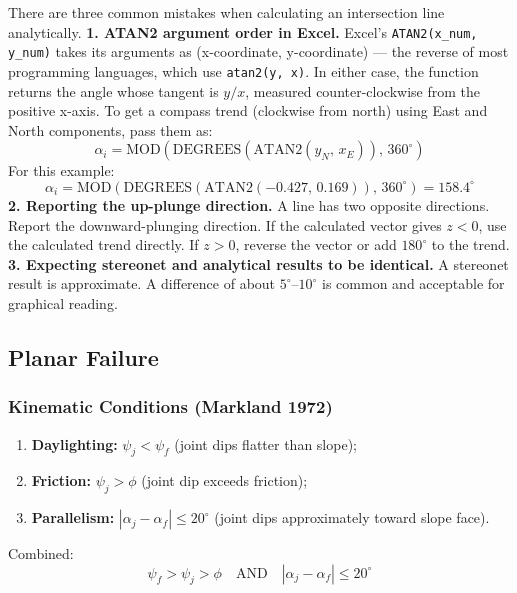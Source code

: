 \documentclass[a4paper,12pt]{article}
\begin{document}
\begin{warnbox}
There are three common mistakes when calculating an intersection line analytically.
\vspace{1.0 em}
\textbf{1. ATAN2 argument order in Excel.}
Excel's \texttt{ATAN2(x\_num, y\_num)} takes its arguments as
(x-coordinate, y-coordinate) --- the reverse of most programming languages,
which use \texttt{atan2(y, x)}. In either case, the function returns the angle
whose tangent is $y/x$, measured counter-clockwise from the positive x-axis.
To get a compass trend (clockwise from north) using East and North components,
pass them as:
\[
\alpha_i =
\mathrm{MOD}\!\left(\mathrm{DEGREES}(\mathrm{ATAN2}(y_N,\, x_E)),\, 360^\circ\right)
\]
For this example:
\[
\alpha_i =
\mathrm{MOD}\!\left(\mathrm{DEGREES}(\mathrm{ATAN2}(-0.427,\, 0.169)),\, 360^\circ\right)
=
158.4^\circ
\]
\vspace{1.0 em}
\textbf{2. Reporting the up-plunge direction.}
A line has two opposite directions. Report the downward-plunging direction. If the calculated vector gives $z<0$, use the calculated trend directly. If $z>0$, reverse the vector or add $180^\circ$ to the trend.
\vspace{1.0 em}
\textbf{3. Expecting stereonet and analytical results to be identical.}
A stereonet result is approximate. A difference of about $5^\circ$--$10^\circ$ is common and acceptable for graphical reading.
\end{warnbox}

\subsection{Planar Failure}

\subsubsection{Kinematic Conditions (Markland 1972)}
\begin{enumerate}[label=\arabic*., nosep]
    \item \textbf{Daylighting:} $\psi_j < \psi_f$ (joint dips flatter than slope);
    \item \textbf{Friction:} $\psi_j > \phi$ (joint dip exceeds friction);
    \item \textbf{Parallelism:} $|\alpha_j - \alpha_f| \leq 20^\circ$ (joint dips approximately toward slope face).
\end{enumerate}

Combined:
\[
\boxed{\psi_f > \psi_j > \phi \quad \text{AND} \quad |\alpha_j - \alpha_f| \leq 20^\circ}
\]
\end{document}
